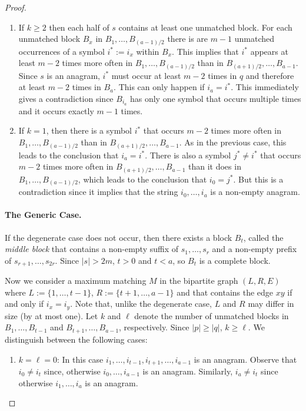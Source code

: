 \documentclass[kpfonts]{patmorin}
\begin{document}
\begin{proof}
\begin{enumerate}
        \item If $k\ge 2$ then each half of $s$ contains at least one unmatched block.  For each unmatched block $B_x$ in $B_1,\ldots,B_{(a-1)/2}$ there is are $m-1$ unmatched occurrences of a symbol $i^*:=i_x$ within $B_x$.  This implies that $i^*$ appears at least $m-2$ times more often in $B_1,\ldots,B_{(a-1)/2}$ than in $B_{(a+1)/2},\ldots,B_{a-1}$.  Since $s$ is an anagram, $i^*$ must occur at least $m-2$ times in $q$ and therefore at least $m-2$ times in $B_a$. This can only happen if $i_a=i^*$. This immediately gives a contradiction since $B_{i_a}$ has only one symbol that occurs multiple times and it occurs exactly $m-1$ times.

        \item If $k=1$, then there is a symbol $i^*$ that occurs $m-2$ times more often in $B_1,\ldots,B_{(a-1)/2}$ than in $B_{(a+1)/2},\ldots,B_{a-1}$.  As in the previous case, this leads to the conclusion that $i_a=i^*$.  There is also a symbol $j^*\neq i^*$ that occurs $m-2$ times more often in $B_{(a+1)/2},\ldots,B_{a-1}$ than it does in $B_{1},\ldots,B_{(a-1)/2}$, which leads to the conclusion that $i_0=j^*$.  But this is a contradiction since it implies that the string $i_0,\ldots,i_a$ is a non-empty anagram.
    \end{enumerate}

    \paragraph{The Generic Case.}
    If the degenerate case does not occur, then there exists a block $B_t$, called the \emph{middle block} that contains a non-empty suffix of $s_1,\ldots,s_r$ and a non-empty prefix of $s_{r+1},\ldots,s_{2r}$.  Since $|s| > 2m$,  $t> 0$ and $t<a$, so $B_t$ is a complete block.

    Now we consider a maximum matching $M$ in the bipartite graph $(L,R,E)$ where $L:=\{1,\ldots,t-1\}$, $R:=\{t+1,\ldots,a-1\}$ and that contains the edge $xy$ if and only if $i_x=i_y$.  Note that, unlike the degenerate case, $L$ and $R$ may differ in size (by at most one).  Let $k$ and $\ell$ denote the number of unmatched blocks in $B_1,\ldots,B_{t-1}$ and $B_{t+1},\ldots,B_{a-1}$, respectively.  Since $|p|\ge |q|$, $k\ge\ell$.  We distinguish between the following cases:

    \begin{enumerate}
        \item $k=\ell=0$: In this case $i_1,\ldots,i_{t-1},i_{t+1},\ldots,i_{a-1}$ is an anagram.  Observe that $i_0\neq i_t$ since, otherwise $i_0,\ldots,i_{a-1}$ is an anagram.  Similarly, $i_a\neq i_t$ since otherwise $i_1,\ldots,i_a$ is an anagram.


\end{enumerate}
\end{proof}
\end{document}
